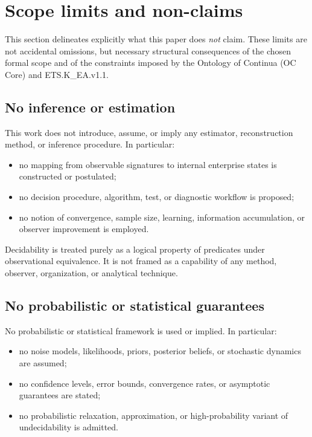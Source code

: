 \section{Scope limits and non-claims}
\label{sec:scope-limits}

This section delineates explicitly what this paper does \emph{not}
claim. These limits are not accidental omissions, but necessary
structural consequences of the chosen formal scope and of the
constraints imposed by the Ontology of Continua (OC Core) and
ETS.K\_EA.v1.1.

\subsection{No inference or estimation}
\label{subsec:no-inference}

This work does not introduce, assume, or imply any estimator,
reconstruction method, or inference procedure. In particular:
\begin{itemize}
\item no mapping from observable signatures to internal enterprise
      states is constructed or postulated;
\item no decision procedure, algorithm, test, or diagnostic workflow is
      proposed;
\item no notion of convergence, sample size, learning, information
      accumulation, or observer improvement is employed.
\end{itemize}

Decidability is treated purely as a logical property of predicates under
observational equivalence. It is not framed as a capability of any
method, observer, organization, or analytical technique.

\subsection{No probabilistic or statistical guarantees}
\label{subsec:no-probability}

No probabilistic or statistical framework is used or implied. In
particular:
\begin{itemize}
\item no noise models, likelihoods, priors, posterior beliefs, or
      stochastic dynamics are assumed;
\item no confidence levels, error bounds, convergence rates, or
      asymptotic guarantees are stated;
\item no probabilistic relaxation, approximation, or high-probability
      variant of undecidability is admitted.
\end{itemize}

